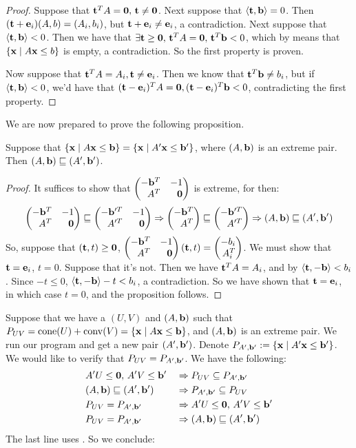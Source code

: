 \begin{proof}
	Suppose that $\mathbf{t}^T A = \mathbf{0},\, \mathbf{t}\neq\mathbf{0}$.  Next suppose that $\left\langle \mathbf{t}, \mathbf{b} \right\rangle = 0$.  Then $(\mathbf{t} + \mathbf{e}_i)(A,b) = (A_i,b_i)$, but $\mathbf{t}+\mathbf{e}_i \neq \mathbf{e}_i$, a contradiction.  Next suppose that ${\left\langle \mathbf{t}, \mathbf{b} \right\rangle < 0}$.  Then we have that $\exists \mathbf{t}\geq\mathbf{0},\,\mathbf{t}^T A = \mathbf{0},\,\mathbf{t}^T \mathbf{b} < 0$, which by  means that $\left\{\mathbf{x}\;|\; A\mathbf{x}\leq b\right\}$ is empty, a contradiction.  So the first property is proven.

	Now suppose that $\mathbf{t}^T A = A_i, \mathbf{t}\neq\mathbf{e}_i$.  Then we know that $\mathbf{t}^T \mathbf{b} \neq b_i$, but if $\left\langle \mathbf{t}, \mathbf{b} \right\rangle < 0$, we'd have that $(\mathbf{t} - \mathbf{e}_i)^T A = \mathbf{0}, (\mathbf{t}-\mathbf{e}_i)^T\mathbf{b} < 0$, contradicting the first property.
\end{proof}

We are now prepared to prove the following proposition.

\begin{Prop}\label{extreme_Ab}
	Suppose that $\left\{\mathbf{x}\;|\; A\mathbf{x}\leq \mathbf{b}\right\} = \left\{\mathbf{x}\;|\; A'\mathbf{x}\leq \mathbf{b}'\right\}$, where $(A,\mathbf{b})$ is an extreme pair.  Then $(A,\mathbf{b}) \sqsubseteq (A',\mathbf{b}')$.
\end{Prop}

\begin{proof}
	It suffices to show that $\pmb -\b^T & -1 \\ A^T & \0 \pme$ is extreme, for then:
	\[\pmb -\b^T & -1 \\ A^T & \0 \pme \sqsubseteq \pmb -\b'^T & -1 \\ A'^T & \0 \pme \Rightarrow
		\pmb -\b^T \\ A^T \pme \sqsubseteq \pmb -\b'^T \\ A'^T \pme \Rightarrow
		(A,\b) \sqsubseteq (A',\b')
	\]
	So, suppose that $(\mathbf{t},t) \geq \mathbf{0}$, $\pmb -\b^T & -1 \\ A^T & \0 \pme(\t,t) = \pmb -b_i \\ A^T_i\pme$.  We must show that $\mathbf{t} = \mathbf{e}_i$, $t = 0$.  Suppose that it's not.  Then we have $\mathbf{t}^T A = A_i$, and by  $\left\langle \mathbf{t}, -\mathbf{b} \right\rangle < b_i$.  Since $-t \leq 0$, $\left\langle \mathbf{t}, -\mathbf{b} \right\rangle - t < b_i$, a contradiction.  So we have shown that $\mathbf{t} = \mathbf{e}_i$, in which case $t = 0$, and the proposition follows.
\end{proof}

Suppose that we have a $(U,V)$ and $(A,\mathbf{b})$ such that $P_{UV} = \operatorname{cone}(U) + \operatorname{conv}(V) = \left\{\mathbf{x}\;|\; A\mathbf{x}\leq \mathbf{b}\right\}$, and $(A,\mathbf{b})$ is an extreme pair.  We run our program and get a new pair $(A',\mathbf{b}')$.  Denote $P_{A',\mathbf{b}'} := \left\{\mathbf{x}\;|\; A'\mathbf{x}\leq \mathbf{b}'\right\}$.  We would like to verify that $P_{UV} = P_{A',\mathbf{b}'}$.  We have the following:
\begin{alignat*}{2}
	 & A'U\leq\mathbf{0},\, A'V\leq\mathbf{b}'     & \;\Rightarrow\; & P_{UV} \subseteq P_{A',\mathbf{b}'}  \\
	 & (A,\mathbf{b}) \sqsubseteq (A',\mathbf{b}') & \;\Rightarrow\; & P_{A',\mathbf{b}'} \subseteq P_{UV} \\
	 & P_{UV} = P_{A',\mathbf{b}'}         & \;\Rightarrow\; & A'U\leq\mathbf{0},\, A'V\leq\mathbf{b}'      \\
	 & P_{UV} = P_{A',\mathbf{b}'}         & \;\Rightarrow\; & (A,\mathbf{b}) \sqsubseteq (A',\mathbf{b}')
\end{alignat*}
The last line uses .  So we conclude:

